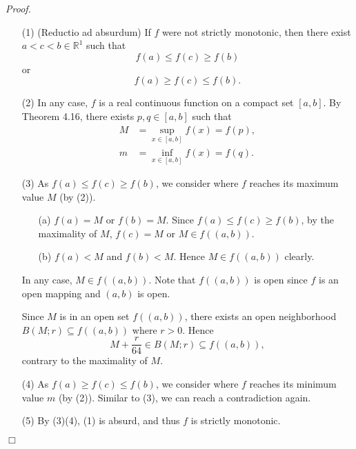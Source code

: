 \documentclass{article}
\begin{document}
\emph{Proof.}
\begin{enumerate}
  \item[(1)]
  (Reductio ad absurdum)
  If $f$ were not strictly monotonic,
  then there exist $a < c < b \in \mathbb{R}^1$ such that
  \[
    f(a) \leq f(c) \geq f(b)
  \]
  or
  \[
    f(a) \geq f(c) \leq f(b).
  \]

  \item[(2)]
  In any case, $f$ is a real continuous function on a compact set $[a,b]$.
  By Theorem 4.16,
  there exists $p, q \in [a,b]$ such that
  \begin{align*}
    M &= \sup_{x \in [a,b]}f(x) = f(p), \\
    m &= \inf_{x \in [a,b]}f(x) = f(q).
  \end{align*}

  \item[(3)]
  As $f(a) \leq f(c) \geq f(b)$, we consider where $f$ reaches its maximum value $M$ (by (2)).
  \begin{enumerate}
  \item[(a)]
    $f(a) = M$ or $f(b) = M$. Since $f(a) \leq f(c) \geq f(b)$, by the maximality of $M$,
    $f(c) = M$ or $M \in f((a,b))$.

  \item[(b)]
    $f(a) < M$ and $f(b) < M$. Hence $M \in f((a,b))$ clearly.
  \end{enumerate}
  In any case, $M \in f((a,b))$.
  Note that $f((a,b))$ is open
  since $f$ is an open mapping and $(a,b)$ is open.

  Since $M$ is in an open set $f((a,b))$,
  there exists an open neighborhood $B(M;r) \subseteq f((a,b))$ where $r > 0$.
  Hence
  \[
    M+\frac{r}{64} \in B(M;r) \subseteq f((a,b)),
  \]
  contrary to the maximality of $M$.

  \item[(4)]
  As $f(a) \geq f(c) \leq f(b)$,
  we consider where $f$ reaches its minimum value $m$ (by (2)).
  Similar to (3), we can reach a contradiction again.

  \item[(5)]
  By (3)(4), (1) is absurd, and thus $f$ is strictly monotonic.
\end{enumerate}
$\Box$ \\\\



\end{document}
